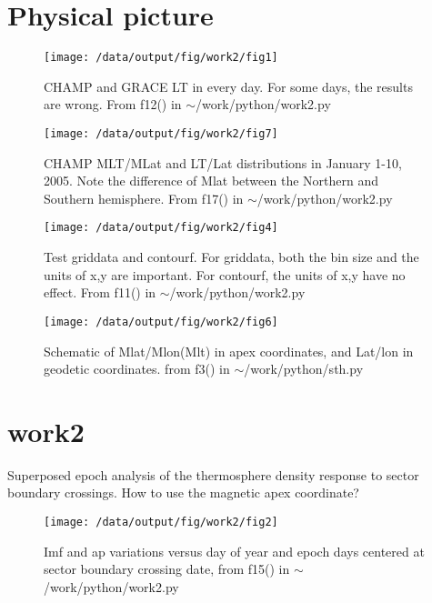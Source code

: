 \documentclass[12pt,a4paper]{article}
\begin{document}
\section{Physical picture}
\begin{figure}[!ht]
    \centering
    \texttt{[image: /data/output/fig/work2/fig1]}
    \label{fig1}
    \caption{CHAMP and GRACE LT in every day. For some days, the results are wrong. From f12() in $\sim$/work/python/work2.py}
\end{figure}

\begin{figure}[!ht]
    \centering
    \texttt{[image: /data/output/fig/work2/fig7]}
    \label{fig2}
    \caption{ CHAMP MLT/MLat and LT/Lat distributions in January 1-10, 2005. Note the difference of Mlat between the Northern and Southern hemisphere. From f17() in $\sim$/work/python/work2.py}
\end{figure}

\begin{figure}[!ht]
    \centering
    \texttt{[image: /data/output/fig/work2/fig4]}
    \label{fig3}
    \caption{Test griddata and contourf. For griddata, both the bin size and the units of x,y are important. For contourf, the units of x,y have no effect. From f11() in $\sim$/work/python/work2.py}
\end{figure}

\begin{figure}[!ht]
    \centering
    \texttt{[image: /data/output/fig/work2/fig6]}
    \label{fig4}
    \caption{Schematic of Mlat/Mlon(Mlt) in apex coordinates, and Lat/lon in geodetic coordinates. from f3() in $\sim$/work/python/sth.py}
\end{figure}
\newpage

\section{work2}
Superposed epoch analysis of the thermosphere density response to sector boundary crossings.
How to use the magnetic apex coordinate?
\begin{figure}[!ht]
    \centering
    \texttt{[image: /data/output/fig/work2/fig2]}
    \label{fig5}
    \caption{Imf and ap variations versus day of year and epoch days centered at sector boundary crossing date, from f15() in $\sim$/work/python/work2.py}
\end{figure}
\end{document}
